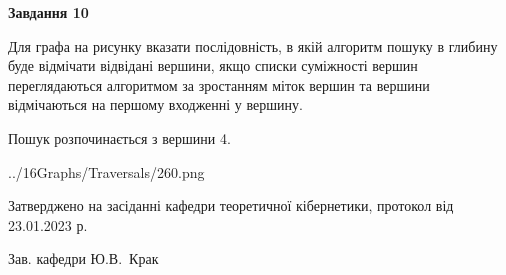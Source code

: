 \documentclass[12pt, ukrainian]{article}
\begin{document}
{\begin {large}
{\begin {center}\textbf{Завдання 10}\end {center}}\par
Для графа на рисунку вказати послідовність, в якій алгоритм пошуку в глибину буде відмічати відвідані вершини, якщо списки суміжності вершин переглядаються алгоритмом за зростанням міток вершин та вершини відмічаються на першому вход\-женні у вершину.\par
Пошук розпочинається з вершини 4.\par

\begin{center}
	{../16Graphs/Traversals/260.png}
\end{center}\par
\newpage


\end {large}
}
{\smallskip \begin {small} Затверджено на засіданні кафедри теоретичної кібернетики, протокол  від   23.01.2023 р.\par\smallskip\smallskip
{\parbox {6.5 cm}{Зав. кафедри \dotfill Ю.В.~Крак}} \end{small}}
\end{document}
